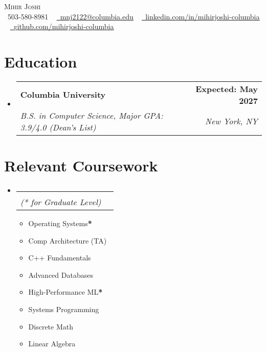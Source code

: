\documentclass[letterpaper,11pt]{article}
\makeatletter
\newcommand{\resumeSubheading}[4]{
  \vspace{-2pt}\item
    \begin{tabular*}{1.0\textwidth}[t]{l@{\extracolsep{\fill}}r}
      \textbf{#1} & \textbf{\small #2} \\
      \textit{\small#3} & \textit{\small #4} \\
    \end{tabular*}\vspace{-7pt}
}
\newcommand{\resumeSubHeadingListStart}{\begin{itemize}[leftmargin=0.0in, label={}]}
\newcommand{\resumeSubHeadingListEnd}{\end{itemize}}
\makeatother
\begin{document}

\begin{center}
    {\huge \scshape Mihir Joshi} \\ \vspace{1pt}
    \small \raisebox{-0.1\height}\ 503-580-8981 ~ \href{mailto:mnj2122@columbia.edu}{\raisebox{-0.2\height}\  \underline{mnj2122@columbia.edu}} ~ 
    \href{https://linkedin.com/in/mihirjoshi-columbia}{\raisebox{-0.2\height}\ \underline{linkedin.com/in/mihirjoshi-columbia}}  ~
    \href{https://github.com/mihirjoshi-columbia/}{\raisebox{-0.2\height}\ \underline{github.com/mihirjoshi-columbia}}
    \vspace{-8pt}
\end{center}


\section{Education}
  \resumeSubHeadingListStart
    \resumeSubheading
      {Columbia University}{Expected: May 2027}
      {B.S. in Computer Science, Major GPA: 3.9/4.0 (Dean's List)}{New York, NY}
  \resumeSubHeadingListEnd

\section{Relevant Coursework}
    \resumeSubHeadingListStart
        \vspace{-15pt}
        \resumeSubheading{}{}{\small (* for Graduate Level)}{}
        \vspace{4pt}
        \begin{multicols}{4}
            \begin{itemize}[itemsep=-5pt, parsep=3pt]
                \item\small Operating Systems\textbf{*} 
                \item Comp Architecture (TA)
                \item C++ Fundamentals 
                \item Advanced Databases
                \item High-Performance ML\textbf{*}
                \item Systems Programming
                \item Discrete Math
                \item Linear Algebra
            \end{itemize}
        \end{multicols}
        \vspace*{2.0\multicolsep}
    \resumeSubHeadingListEnd
\end{document}
